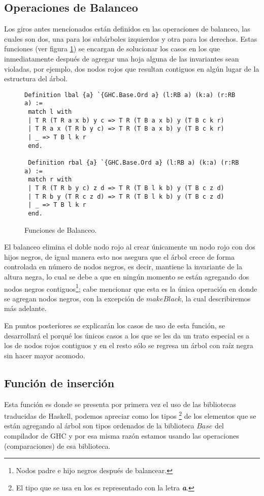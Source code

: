\subsection{Operaciones de Balanceo}
Los giros antes mencionados están definidos en las operaciones de balanceo, las cuales son dos, una 
para los subárboles izquierdos y otra para los derechos. Estas funciones (ver figura 
\ref{func_balanceo}) se encargan de solucionar los casos en los que inmediatamente después de 
agregar una hoja alguna de las invariantes sean violadas, por ejemplo, dos nodos rojos que resultan 
contiguos en algún lugar de la estructura del \'arbol.

\begin{figure}[!ht]
\centering
\captionsetup{justification=centering}
\begin{verbatim}
Definition lbal {a} `{GHC.Base.Ord a} (l:RB a) (k:a) (r:RB a) :=
 match l with
 | T R (T R a x b) y c => T R (T B a x b) y (T B c k r)
 | T R a x (T R b y c) => T R (T B a x b) y (T B c k r)
 | _ => T B l k r
 end.

 Definition rbal {a} `{GHC.Base.Ord a} (l:RB a) (k:a) (r:RB a) :=
 match r with
 | T R (T R b y c) z d => T R (T B l k b) y (T B c z d)
 | T R b y (T R c z d) => T R (T B l k b) y (T B c z d)
 | _ => T B l k r
 end.
\end{verbatim}
\caption{Funciones de Balanceo.}
\label{func_balanceo}
\end{figure}

El balanceo elimina el doble nodo rojo al crear \'unicamente un nodo rojo con dos hijos negros, de 
igual manera esto nos asegura que el árbol crece de forma controlada en n\'umero de nodos negros, es
decir, mantiene la invariante de la altura negra, lo cual se debe a que en ningún momento se están 
agregando dos nodos negros contiguos\footnote{Nodos padre e hijo negros después de balancear.}; cabe
 mencionar que esta es la única operación en donde se agregan nodos negros, con la excepción de 
 \hyperref[raiz_negra_func]{$makeBlack$}, la cual describiremos m\'as adelante.

En puntos posteriores se explicar\'an los casos de uso de esta función, se desarrollar\'a el 
porqu\'e los \'unicos casos a los que se les da un trato especial es a los de nodos rojos contiguos
y en el resto s\'olo se regresa un \'arbol con ra\'iz negra sin hacer mayor acomodo.

\subsection {Funci\'on de inserci\'on}
Esta funci\'on es donde se presenta por primera vez el uso de las bibliotecas traducidas de
Haskell, podemos apreciar como los tipos \footnote{El tipo que se usa en los {\arns} es representado 
con la letra \textbf{\textit{a}}.} de los elementos que se est\'an agregando al \'arbol son tipos
ordenados de la biblioteca $Base$ del compilador de GHC y por esa misma raz\'on estamos usando las
operaciones (comparaciones) de esa biblioteca.

